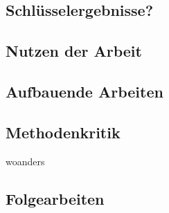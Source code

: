 \documentclass{Bericht}
\begin{document}
\subsection{Schlüsselergebnisse?}
\subsection{Nutzen der Arbeit}
\subsection{Aufbauende Arbeiten}
\subsection{Methodenkritik}
woanders
\subsection{Folgearbeiten}
	
\end{document}
